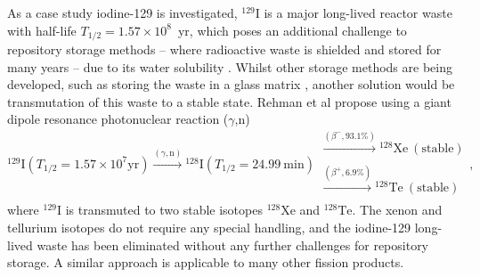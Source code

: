 \documentclass[../main.tex]{subfiles}
\begin{document}
As a case study iodine-129 is investigated, $^{129}\mathrm{I}$ is a major long-lived reactor waste with half-life $T_{1/2} = 1.57\times 10^{8}$~yr, which poses an additional challenge to repository storage methods -- where radioactive waste is shielded and stored for many years -- due to its water solubility \cite{cho2016reconsideration}. Whilst other storage methods are being developed, such as storing the waste in a glass matrix  \cite{lee2021chemical,morizet2021immobilization}, another solution would be transmutation of this waste to a stable state. Rehman et al \cite{ur2017optimization} propose using a giant dipole resonance photonuclear reaction ($\gamma$,n)
\begin{equation}
^{129}\mathrm{I} \left(T_{1/2}=1.57\times 10^{7}\textrm{yr}\right) \xrightarrow[]{\left(\gamma,\mathrm{n}\right)} {}^{128}\mathrm{I} \left(T_{1/2}=24.99~\mathrm{\si{\minute}}\right) \substack{\xrightarrow[]{\left(\beta^{-},93.1\%\right)} {}^{128}\mathrm{Xe}~\left(\mathrm{stable}\right)\\[0.1em] \xrightarrow[]{\left(\beta^{+},6.9\%\right)} {}^{128}\mathrm{Te}~\left(\mathrm{stable}\right)},
\label{eq:129I_photonuclear_transmutation}
\end{equation}
where $^{129}\mathrm{I}$ is transmuted to two stable isotopes $^{128}\mathrm{Xe}$ and $^{128}\mathrm{Te}$. The xenon and tellurium isotopes do not require any special handling, and the iodine-129 long-lived waste has been eliminated without any further challenges for repository storage. A similar approach is applicable to many other fission products.
\end{document}
